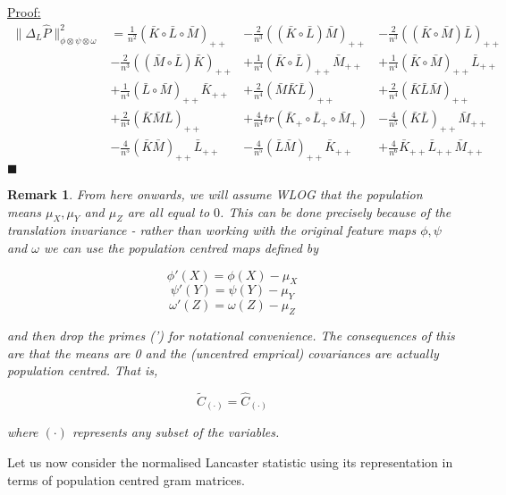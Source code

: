 \documentclass{article}
\newtheorem*{remark}{Remark}
\newenvironment{claimproof}[1]{\par\noindent\underline{Proof:}\space#1}{\hfill $\blacksquare$}
\begin{document}
\begin{claimproof}
\begin{align*}
\|\Delta_L \hat{P}\|_{\phi\otimes\psi\otimes\omega}^2 
 &= \frac{1}{n^2}(\bar{K} \circ \bar{L}\circ \bar{M})_{++} &-
\frac{2}{n^3}((\bar{K}\circ \bar{L}) \bar{M})_{++} & - 
\frac{2}{n^3}((\bar{K} \circ \bar{M}) \bar{L})_{++} \\&- 
\frac{2}{n^3}((\bar{M} \circ \bar{L}) \bar{K})_{++} &+ 
\frac{1}{n^4}(\bar{K} \circ \bar{L})_{++} \bar{M}_{++} &+ 
\frac{1}{n^4}(\bar{K} \circ \bar{M})_{++} \bar{L}_{++} \\&+ 
\frac{1}{n^4}(\bar{L} \circ \bar{M})_{++} \bar{K}_{++} &+ 
\frac{2}{n^4}(\bar{M}\bar{K}\bar{L})_{++} &+ 
\frac{2}{n^4}(\bar{K}\bar{L}\bar{M})_{++} \\&+ 
\frac{2}{n^4}(\bar{K}\bar{M}\bar{L})_{++} &+ 
\frac{4}{n^4}tr(\bar{K}_+ \circ \bar{L}_+ \circ \bar{M}_+) &-
\frac{4}{n^5}(\bar{K} \bar{L})_{++} \bar{M}_{++} \\& - 
\frac{4}{n^5}(\bar{K}\bar{M})_{++}\bar{L}_{++} &- 
\frac{4}{n^5}(\bar{L}\bar{M})_{++} \bar{K}_{++} &+
\frac{4}{n^6}\bar{K}_{++} \bar{L}_{++} \bar{M}_{++}
\end{align*}
\end{claimproof}

\begin{remark} From here onwards, we will assume WLOG that the population means $\mu_X,\mu_Y$ and $\mu_Z$ are all equal to $0$. This can be done precisely because of the translation invariance - rather than working with the original feature maps $\phi,\psi$ and $\omega$ we can use the population centred maps defined by

\[\phi'(X) =\phi(X) -\mu_X\]
\[\psi'(Y) =\psi(Y) -\mu_Y\]
\[\omega'(Z) =\omega(Z) -\mu_Z\]

and then drop the primes (') for notational convenience. The consequences of this are that the means are 0 and the (uncentred emprical) covariances are actually population centred. That is,

\[\tilde{C}_{(\cdot)} = \hat{C}_{(\cdot)}\]

where $(\cdot)$ represents any subset of the variables.
\end{remark}

Let us now consider the normalised Lancaster statistic using its representation in terms of population centred gram matrices.
\end{document}
